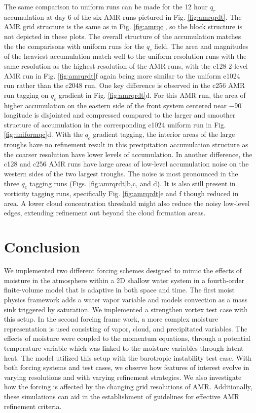 The same comparison to uniform runs can be made for the 12 hour $q_r$ accumulation
at day 6 of the six AMR runs pictured in Fig. \ref{fig:amrqrdt}. The AMR grid structure is the same
as in Fig. \ref{fig:amrqc}, so the block structure is not depicted in these plots. The overall structure
of the accumulation matches the the comparisons with uniform runs for the $q_c$ field.
The area and magnitudes of the heaviest accumulation match well to the uniform resolution runs
with the same resolution as the highest resolution of the AMR runs, with the c128 2-level AMR run
in Fig. \ref{fig:amrqrdt}f again being more similar to the uniform c1024 run rather than the c2048 run.
One key difference is observed in the 
c256 AMR run tagging on $q_c$ gradient in Fig. \ref{fig:amrqrdt}d. For this AMR run, the
 area of higher accumulation on the eastern side of the front
system centered near $-90^\circ$ longitude
is disjointed and compressed compared to the larger and smoother structure of accumulation in
the corresponding c1024 uniform run in Fig. \ref{fig:uniformqc}d.
With the $q_c$ gradient tagging, the interior areas of the large troughs have no refinement result in
this precipitation accumulation structure as the coarser resolution have lower levels of accumulation.
In another difference, the c128 and c256 AMR runs have large areas of low-level accumulation noise 
on the western sides of the two largest troughs. The noise is most pronounced in the three
$q_c$ tagging runs (Figs. \ref{fig:amrqrdt}b,c, and d). It is also still present in vorticity tagging runs, 
specifically Fig. \ref{fig:amrqrdt}e and f though reduced in area. A lower cloud concentration threshold 
might also reduce the noisy low-level edges, extending refinement out beyond the cloud formation areas.


\section{Conclusion}
We implemented two different forcing schemes designed to 
mimic the effects of moisture in the atmosphere within a 2D 
shallow water system in a fourth-order finite-volume model
that is adaptive in both space and time. The first moist physics
framework adds a water vapor variable and models convection
as a mass sink triggered by saturation. We implemented a
strengthen vortex test case with this setup.  In the second
forcing frame work, a more complex moisture representation
is used consisting of vapor, cloud, and precipitated variables.
The effects of moisture were coupled to the momentum equations,
through a potential temperature variable which was linked to
the moisture variables through latent heat. The model utilized
this setup with the barotropic instability test case. 
With both forcing systems and test cases, we observe
how features of interest evolve in varying resolutions and 
with varying refinement strategies. We also investigate 
how the forcing is affected by the changing grid resolutions of
AMR. Additionally, these simulations can aid in the
establishment of guidelines for effective AMR refinement criteria.


